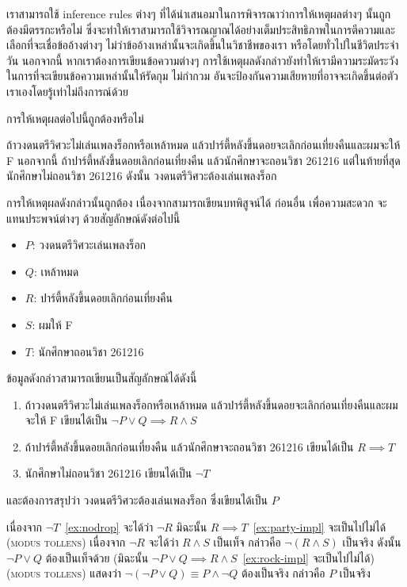 เราสามารถใช้ inference rules ต่างๆ ที่ได้นำเสนอมาในการพิจารณาว่าการให้เหตุผลต่างๆ นั้นถูกต้องมีตรรกะหรือไม่ ซึ่งจะทำให้เราสามารถใช้วิจารณญาณได้อย่างเต็มประสิทธิภาพในการตีความและเลือกที่จะเชื่อข้ออ้างต่างๆ ไม่ว่าข้ออ้างเหล่านั้นจะเกิดขึ้นในวิชาชีพของเรา หรือโดยทั่วไปในชีวิตประจำวัน \enskip นอกจากนี้ หากเราต้องการเขียนข้อความต่างๆ การใช้เหตุผลดังกล่าวยังทำให้เรามีความระมัดระวังในการที่จะเขียนข้อความเหล่านั้นให้รัดกุม ไม่กำกวม อันจะป้องกันความเสียหายที่อาจจะเกิดขึ้นต่อตัวเราเองโดยรู้เท่าไม่ถึงการณ์ด้วย
%
\begin{example}
การให้เหตุผลต่อไปนี้ถูกต้องหรือไม่

ถ้าวงดนตรีวิศวะไม่เล่นเพลงร็อกหรือเหล้าหมด แล้วปาร์ตี้หลังขึ้นดอยจะเลิกก่อนเที่ยงคืนและผมจะให้ F \enskip นอกจากนี้ ถ้าปาร์ตี้หลังขึ้นดอยเลิกก่อนเที่ยงคืน แล้วนักศึกษาจะถอนวิชา 261216 \enskip แต่ในท้ายที่สุด นักศึกษาไม่ถอนวิชา 261216 \enskip ดังนั้น วงดนตรีวิศวะต้องเล่นเพลงร็อก

การให้เหตุผลดังกล่าวนั้นถูกต้อง เนื่องจากสามารถเขียนบทพิสูจน์ได้ \enskip ก่อนอื่น เพื่อความสะดวก จะแทนประพจน์ต่างๆ ด้วยสัญลักษณ์ดังต่อไปนี้
\begin{itemize}
\item $P$: วงดนตรีวิศวะเล่นเพลงร็อก
\item $Q$: เหล้าหมด
\item $R$: ปาร์ตี้หลังขึ้นดอยเลิกก่อนเที่ยงคืน
\item $S$: ผมให้ F
\item $T$: นักศึกษาถอนวิชา 261216
\end{itemize}
ข้อมูลดังกล่าวสามารถเขียนเป็นสัญลักษณ์ได้ดังนี้
\begin{enumerate}[ref=(\arabic*)]
\item\label{ex:rock-impl} ถ้าวงดนตรีวิศวะไม่เล่นเพลงร็อกหรือเหล้าหมด แล้วปาร์ตี้หลังขึ้นดอยจะเลิกก่อนเที่ยงคืนและผมจะให้ F เขียนได้เป็น $\neg P\vee Q \implies R\wedge S$
\item\label{ex:party-impl} ถ้าปาร์ตี้หลังขึ้นดอยเลิกก่อนเที่ยงคืน แล้วนักศึกษาจะถอนวิชา 261216 เขียนได้เป็น $R\implies T$
\item\label{ex:nodrop} นักศึกษาไม่ถอนวิชา 261216 เขียนได้เป็น $\neg T$
\end{enumerate}
และต้องการสรุปว่า วงดนตรีวิศวะต้องเล่นเพลงร็อก ซึ่งเขียนได้เป็น $P$
\begin{pf}
เนื่องจาก $\neg T$~\ref{ex:nodrop} จะได้ว่า $\neg R$ มิฉะนั้น $R\implies T$~\ref{ex:party-impl} จะเป็นไปไม่ได้ (\textsc{modus tollens}) \enskip เนื่องจาก $\neg R$ จะได้ว่า $R\wedge S$ เป็นเท็จ กล่าวคือ $\neg(R\wedge S)$ เป็นจริง ดังนั้น $\neg P\vee Q$ ต้องเป็นเท็จด้วย (มิฉะนั้น $\neg P\vee Q \implies R\wedge S$~\ref{ex:rock-impl} จะเป็นไปไม่ได้) (\textsc{modus tollens}) แสดงว่า $\neg(\neg P\vee Q)\equiv P\wedge\neg Q$ ต้องเป็นจริง กล่าวคือ $P$ เป็นจริง
\end{pf}


\end{example}
